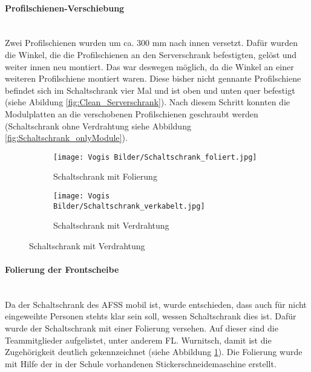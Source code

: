     \paragraph{Profilschienen-Verschiebung}\mbox{}\\
    Zwei Profilschienen wurden um ca. 300 mm nach innen versetzt. Dafür wurden die Winkel, die die Profilschienen an den Serverschrank befestigten, gelöst und weiter innen neu montiert. Das war deswegen möglich, da die Winkel an einer weiteren Profilschiene montiert waren. Diese bisher nicht gennante Profilschiene befindet sich im Schaltschrank vier Mal und ist oben und unten quer befestigt (siehe Abildung \ref{fig:Clean_Serverschrank}). Nach diesem Schritt konnten die Modulplatten an die verschobenen Profilschienen geschraubt werden (Schaltschrank ohne Verdrahtung siehe Abbildung \ref{fig:Schaltschrank_onlyModule}).  
    \begin{figure}[H]
        \centering
        \begin{subfigure}{0.45\textwidth}
            \centering
            \texttt{[image: Vogis Bilder/Schaltschrank\_foliert.jpg]}
            \caption{Schaltschrank mit Folierung}
            \label{fig:Schaltschrank_foliert}
        \end{subfigure}
        \hfill
        \begin{subfigure}{0.4\textwidth}
            \centering
            \texttt{[image: Vogis Bilder/Schaltschrank\_verkabelt.jpg]}
            \caption{Schaltschrank mit Verdrahtung}
            \label{fig:Schaltschrank_verkabelt}
        \end{subfigure}
    \end{figure}
    \paragraph{Folierung der Frontscheibe}\mbox{}\\
    Da der Schaltschrank des AFSS mobil ist, wurde entschieden, dass auch für nicht eingeweihte Personen stehts klar sein soll, wessen Schaltschrank dies ist. Dafür wurde der Schaltschrank mit einer Folierung versehen. Auf dieser sind die Teammitglieder aufgelistet, unter anderem FL. Wurnitsch, damit ist die Zugehörigkeit deutlich gekennzeichnet (siehe Abbildung \ref{fig:Schaltschrank_foliert}). Die Folierung wurde mit Hilfe der in der Schule vorhandenen Stickerschneidemaschine erstellt.

